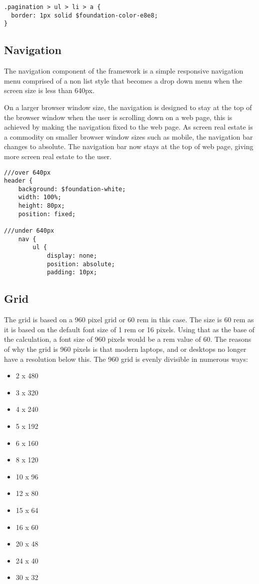 \begin{lstlisting}[language=CSS3]
.pagination > ul > li > a {
  border: 1px solid $foundation-color-e8e8;
}
\end{lstlisting}

\subsection*{Navigation}
The navigation component of the framework is a simple responsive navigation menu  comprised of a non list style that becomes a drop down menu when the screen size is less than 640px.

On a larger browser window size, the navigation is designed to stay at the top of the browser window when the user is scrolling down on a web page, this is achieved by making the navigation fixed to the web page. As screen real estate is a commodity on smaller browser window sizes such as mobile, the navigation bar changes to absolute. The navigation bar now stays at the top of web page, giving more screen real estate to the user. 

\begin{lstlisting}[language=CSS3]
///over 640px
header {
	background: $foundation-white;
	width: 100%;
	height: 80px;
	position: fixed; 
	
///under 640px			
	nav {
		ul {
			display: none;
			position: absolute;
			padding: 10px;
\end{lstlisting}
\subsection*{Grid}

The grid is based on a 960 pixel grid or 60 rem in this case. The size is 60 rem as it is based on the default font size of 1 rem or 16 pixels. Using that as the base of the calculation, a font size of 960 pixels would be a rem value of 60. The reasons of why the grid is 960 pixels is that modern laptops, and or desktops no longer have a resolution below this. The 960 grid is evenly divisible in numerous ways: 

\begin{itemize}
	\item 2 x 480
	\item 3 x 320
	\item 4 x 240
	\item 5 x 192
	\item 6 x 160
	\item 8 x 120
	\item 10 x 96
	\item 12 x 80
	\item 15 x 64
	\item 16 x 60
	\item 20 x 48
	\item 24 x 40
	\item 30 x 32
\end{itemize}

